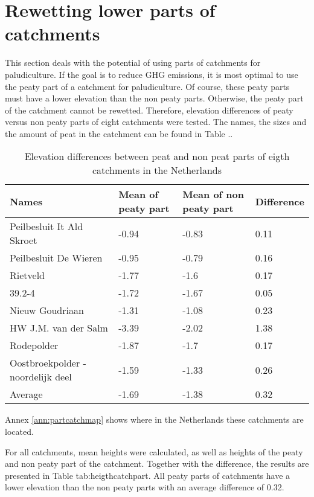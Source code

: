 {\section{Rewetting lower parts of catchments}
This section deals with the potential of using parts of catchments for paludiculture. If the goal is to reduce GHG emissions, it is most optimal to use the peaty part of a catchment for paludiculture. Of course, these peaty parts must have a lower elevation than the non peaty parts. Otherwise, the peaty part of the catchment cannot be rewetted. Therefore, elevation differences of peaty versus non peaty parts of eight catchments were tested. The names, the sizes and the amount of peat in the catchment can be found in Table ..

\begin{table}[htbp]
\caption{Elevation differences between peat and non peat parts of eigth catchments in the Netherlands}
\begin{center}
\begin{tabular}{|p{4cm}|p{4cm}|p{4cm}|p{4cm}|}
\hline
\textbf{Names} & \multicolumn{1}{l|}{\textbf{Mean of peaty part}} & \multicolumn{1}{l|}{\textbf{Mean of non peaty part}} & \multicolumn{1}{l|}{\textbf{Difference}} \\ \hline
Peilbesluit It Ald Skroet & -0.94 & -0.83 & 0.11 \\ \hline
Peilbesluit De Wieren & -0.95 & -0.79 & 0.16 \\ \hline
Rietveld & -1.77 & -1.6 & 0.17 \\ \hline
39.2-4 & -1.72 & -1.67 & 0.05 \\ \hline
Nieuw Goudriaan & -1.31 & -1.08 & 0.23 \\ \hline
HW J.M. van der Salm & -3.39 & -2.02 & 1.38 \\ \hline
Rodepolder & -1.87 & -1.7 & 0.17 \\ \hline
Oostbroekpolder - noordelijk deel & -1.59 & -1.33 & 0.26 \\ \hline
Average & -1.69 & -1.38 & 0.32 \\ \hline
\end{tabular}
\end{center}
\label{tab:heigthcatchpart}
\end{table}

Annex \ref{ann:partcatchmap} shows where in the Netherlands these catchments are located.


For all catchments, mean heights were calculated, as well as heights of the peaty and non peaty part of the catchment. Together with the difference, the results are presented in Table {tab:heigthcatchpart}. All peaty parts of catchments have a lower elevation than the non peaty parts with an average difference of 0.32. 


}
